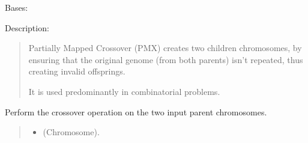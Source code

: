 \documentclass[letterpaper,10pt,english]{sphinxmanual}
\begin{document}
\begin{fulllineitems}
\label{\detokenize{pygenalgo.operators.crossover:pygenalgo.operators.crossover.partially_mapped_crossover.PartiallyMappedCrossover}}
\pysigstartsignatures
{}
\pysigstopsignatures
\sphinxAtStartPar
Bases: {\hyperref[\detokenize{pygenalgo.operators.crossover:pygenalgo.operators.crossover.crossover_operator.CrossoverOperator}]{}}

\sphinxAtStartPar
Description:
\begin{quote}

\sphinxAtStartPar
Partially Mapped Crossover (PMX) creates two children chromosomes, by ensuring that the
original genome (from both parents) isn’t repeated, thus creating invalid offsprings.

\sphinxAtStartPar
It is used predominantly in combinatorial problems.
\end{quote}

\begin{fulllineitems}
\label{\detokenize{pygenalgo.operators.crossover:pygenalgo.operators.crossover.partially_mapped_crossover.PartiallyMappedCrossover.crossover}}
\pysigstartsignatures
{}
\pysigstopsignatures
\sphinxAtStartPar
Perform the crossover operation on the two input parent chromosomes.
\begin{quote}\begin{description}
\begin{itemize}
\item {} 
\sphinxAtStartPar
{} \textendash{} (Chromosome).


\end{itemize}
\end{description}
\end{quote}
\end{fulllineitems}
\end{fulllineitems}
\end{document}
